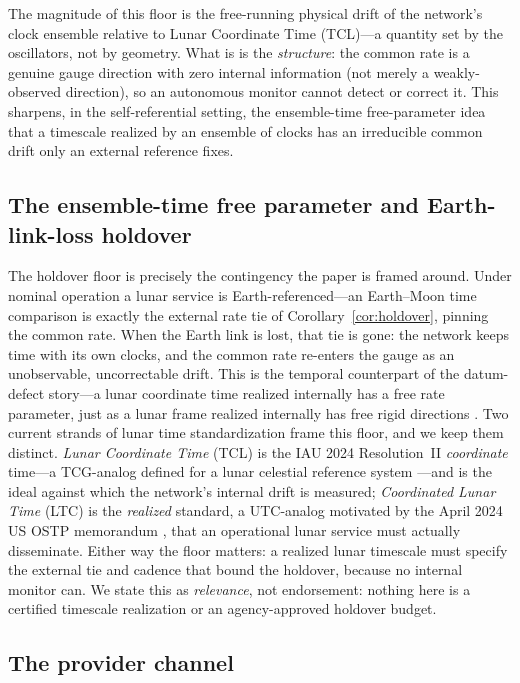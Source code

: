 The magnitude of this floor is the free-running physical drift of the network's clock
ensemble relative to Lunar Coordinate Time (TCL)---a \Modelled{} quantity set by the
oscillators, not by geometry. What is \Proven{} is the \emph{structure}: the common rate is a
genuine gauge direction with zero internal information (not merely a weakly-observed
direction), so an autonomous monitor cannot detect or correct it. This sharpens, in the
self-referential setting, the ensemble-time free-parameter idea that a timescale realized by
an ensemble of clocks has an irreducible common drift only an external reference fixes.

\subsection{The ensemble-time free parameter and Earth-link-loss holdover}
\label{sec:ensemble}

The holdover floor is precisely the contingency the paper is framed around. Under nominal
operation a lunar service is Earth-referenced---an Earth--Moon time comparison is exactly the
external rate tie of Corollary~\ref{cor:holdover}, pinning the common rate. When the Earth
link is lost, that tie is gone: the network keeps time with its own clocks, and the common
rate re-enters the gauge as an unobservable, uncorrectable drift. This is the temporal
counterpart of the datum-defect story---a lunar coordinate time realized internally has a
free rate parameter, just as a lunar frame realized internally has free rigid directions
\citep{baweja2026gauge}. Two current strands of lunar time standardization frame this floor,
and we keep them distinct. \emph{Lunar Coordinate Time} (TCL) is the IAU 2024 Resolution~II
\emph{coordinate} time---a TCG-analog defined for a lunar celestial reference system
\citep{iau2024ltc}---and is the ideal against which the network's internal drift is measured;
\emph{Coordinated Lunar Time} (LTC) is the \emph{realized} standard, a UTC-analog motivated by
the April 2024 US OSTP memorandum \citep{iau2024ltc,fienga2024moonlight}, that an operational
lunar service must actually disseminate. Either way the floor matters: a realized lunar
timescale must specify the external tie and cadence that bound the holdover, because no
internal monitor can. We state this as \emph{relevance}, not endorsement: nothing here is a
certified timescale realization or an agency-approved holdover budget.

\subsection{The provider channel}
\label{sec:providerchannel}

